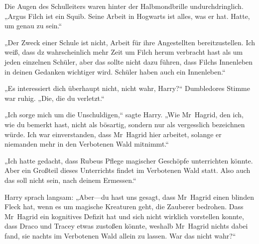 Die Augen des Schulleiters waren hinter der Halbmondbrille undurchdringlich.
„Argus Filch ist ein Squib. Seine Arbeit in Hogwarts ist alles, was er hat. Hatte, um genau zu sein.“

„Der Zweck einer Schule ist nicht, Arbeit für ihre Angestellten bereitzustellen. Ich weiß, dass dz wahrscheinlich mehr Zeit um Filch herum verbracht hast als um jeden einzelnen Schüler, aber das sollte nicht dazu führen, dass Filchs Innenleben in deinen Gedanken wichtiger wird. Schüler haben auch ein Innenleben.“

„Es interessiert dich überhaupt nicht, nicht wahr, Harry?“ Dumbledores Stimme war ruhig. „Die, die du verletzt.“

„Ich sorge mich um die Unschuldigen,“ sagte Harry. „Wie Mr~Hagrid, den ich, wie du bemerkt hast, nicht als bösartig, sondern nur als vergesslich bezeichnen würde. Ich war einverstanden, dass Mr~Hagrid hier arbeitet, solange er niemanden mehr in den Verbotenen Wald mitnimmt.“

„Ich hatte gedacht, dass Rubeus Pflege magischer Geschöpfe unterrichten könnte. Aber ein Großteil dieses Unterrichts findet im Verbotenen Wald statt. Also auch das soll nicht sein, nach deinem Ermessen.“

Harry sprach langsam: „Aber—du hast uns gesagt, dass Mr~Hagrid einen blinden Fleck hat, wenn es um magische Kreaturen geht, die Zauberer bedrohen. Dass Mr~Hagrid ein kognitives Defizit hat und sich nicht wirklich vorstellen konnte, dass Draco und Tracey etwas zustoßen könnte, weshalb Mr~Hagrid nichts dabei fand, sie nachts im Verbotenen Wald allein zu lassen. War das nicht wahr?“


